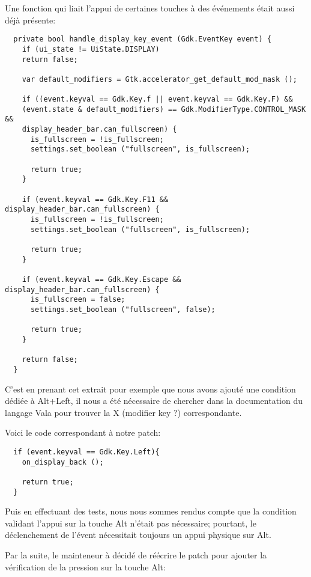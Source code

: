 \documentclass[12pt]{report}
\begin{document}
Une fonction qui liait l'appui de certaines touches à des événements
était aussi déjà présente:

\begin{verbatim}
  private bool handle_display_key_event (Gdk.EventKey event) {
    if (ui_state != UiState.DISPLAY)
    return false;

    var default_modifiers = Gtk.accelerator_get_default_mod_mask ();

    if ((event.keyval == Gdk.Key.f || event.keyval == Gdk.Key.F) &&
    (event.state & default_modifiers) == Gdk.ModifierType.CONTROL_MASK &&
    display_header_bar.can_fullscreen) {
      is_fullscreen = !is_fullscreen;
      settings.set_boolean ("fullscreen", is_fullscreen);

      return true;
    }

    if (event.keyval == Gdk.Key.F11 && display_header_bar.can_fullscreen) {
      is_fullscreen = !is_fullscreen;
      settings.set_boolean ("fullscreen", is_fullscreen);

      return true;
    }

    if (event.keyval == Gdk.Key.Escape && display_header_bar.can_fullscreen) {
      is_fullscreen = false;
      settings.set_boolean ("fullscreen", false);

      return true;
    }
    
    return false;
  }
\end{verbatim}

C'est en prenant cet extrait pour exemple que nous avons ajouté une
condition dédiée à Alt+Left, il nous a été nécessaire de chercher dans
la documentation du langage Vala pour trouver la X (modifier key ?)
correspondante.

Voici le code correspondant à notre patch:

\begin{verbatim}
  if (event.keyval == Gdk.Key.Left){			
    on_display_back ();
    
    return true;
  }
\end{verbatim}

Puis en effectuant des tests, nous nous sommes rendus compte que la
condition validant l'appui sur la touche Alt n'était pas nécessaire;
pourtant, le déclenchement de l'évent nécessitait toujours un appui
physique sur Alt.

Par la suite, le mainteneur à décidé de réécrire le patch pour ajouter
la vérification de la pression sur la touche Alt:
\end{document}
